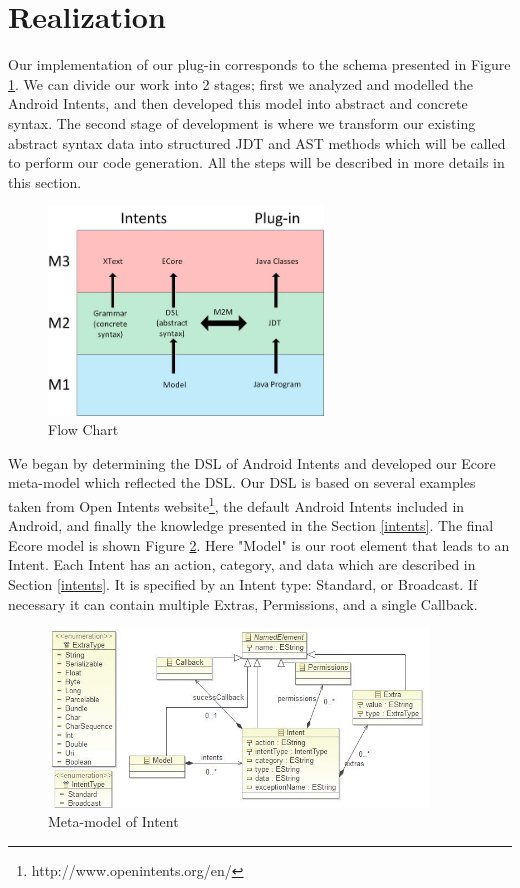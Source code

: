 \section{Realization}
\label{realisation}

Our implementation of our plug-in corresponds to the schema presented in Figure \ref{flowchart}. We can divide our work into 2 stages; first we analyzed and modelled the Android Intents, and then developed this model into abstract and concrete syntax. The second stage of development is where we transform our existing abstract syntax data into structured JDT and AST methods which will be called to perform our code generation. All the steps will be described in more details in this section.  

\begin{figure}[t]
\label{flowchart}
  \centering
    \includegraphics[width=0.65\textwidth]{flowchart}
  \caption{Flow Chart}
\end{figure}

We began by determining the DSL of Android Intents and developed our Ecore meta-model which reflected the DSL. Our DSL is based on several examples taken from Open Intents website\footnote{http://www.openintents.org/en/}, the default Android Intents included in Android, and finally the knowledge presented in the Section \ref{intents}. The final Ecore model is shown Figure \ref{meta-model}. Here "Model" is our root element that leads to an Intent. Each Intent has an action, category, and data which are described in Section \ref{intents}. It is specified by an Intent type: Standard, or Broadcast. If necessary it can contain multiple Extras, Permissions, and a single Callback.

\begin{figure}[t]
\label{meta-model}
  \centering
    \includegraphics[width=0.9\textwidth]{metamodel}
  \caption{Meta-model of Intent}
\end{figure}

